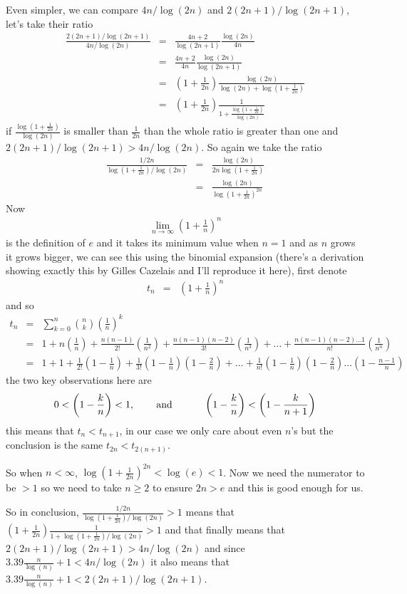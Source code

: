 \documentclass[aps,preprint,preprintnumbers,nofootinbib,showpacs,prd]{revtex4-1}
\newcommand{\nbea}{\begin{eqnarray*}}
\newcommand{\neea}{\end{eqnarray*}}
\begin{document}
Even simpler, we can compare $4n/\log(2n)$ and $2(2n+1)/\log(2n+1)$, let's take their ratio
%
\nbea
\frac{2(2n+1)/\log(2n+1)}{4n/\log(2n)} & = & \frac{4n+2}{\log(2n+1)}\frac{\log(2n)}{4n}\\
& = & \frac{4n+2}{4n} \frac{\log(2n)}{\log(2n+1)} \\
& = & \left(1 + \frac{1}{2n}\right)\frac{\log(2n)}{\log(2n) + \log\left(1 + \frac{1}{2n}\right)} \\
& = & \left(1 + \frac{1}{2n}\right) \frac{1}{1 + \frac{\log\left(1 + \frac{1}{2n}\right)}{\log(2n)}}
\neea
%
if $\frac{\log\left(1 + \frac{1}{2n}\right)}{\log(2n)}$ is smaller than $\frac{1}{2n}$ than the whole ratio is greater than one and $2(2n+1)/\log(2n+1) > 4n/\log(2n)$. So again we take the ratio
%
\nbea
\frac{1/2n}{\log\left(1 + \frac{1}{2n}\right)/\log(2n)} & = & \frac{\log(2n)}{2n\log\left(1 + \frac{1}{2n}\right)} \\
& = & \frac{\log(2n)}{\log\left(1 + \frac{1}{2n}\right)^{2n}}
\neea
%
Now
%
\nbea
\lim_{n\to\infty} \left(1 + \frac{1}{n}\right)^{n}
\neea
%
is the definition of $e$ and it takes its minimum value when $n=1$ and as $n$ grows it grows bigger, we can see this using the binomial expansion (there's a derivation showing exactly this by Gilles Cazelais and I'll reproduce it here), first denote
%
\nbea
t_n & = & \left(1+\frac{1}{n}\right)^n
\neea
%
and so
%
\nbea
t_n  & = & \sum_{k=0}^n {n \choose k}\left(\frac{1}{n}\right)^k \\
& = & 1 + n\left(\frac{1}{n}\right) + \frac{n(n-1)}{2!}\left(\frac{1}{n^2}\right)+ \frac{n(n-1)(n-2)}{3!}\left(\frac{1}{n^3}\right) + \ldots + \frac{n(n-1)(n-2)\ldots 1}{n!}\left(\frac{1}{n^n}\right) \\
& = & 1 + 1 + \frac{1}{2!}\left(1-\frac{1}{n}\right) + \frac{1}{3!}\left(1-\frac{1}{n}\right)\left(1-\frac{2}{n}\right) + \ldots + \frac{1}{n!}\left(1-\frac{1}{n}\right)\left(1-\frac{2}{n}\right)\ldots \left(1-\frac{n-1}{n}\right)
\neea
%
the two key observations here are
%
\nbea
0 < \left(1-\frac{k}{n}\right) <1, & {\rm ~~~~~~~and~~~~~~~} & \left(1-\frac{k}{n}\right) < \left(1-\frac{k}{n+1}\right)
\neea
%
this means that $t_n < t_{n+1}$, in our case we only care about even $n$'s but the conclusion is the same $t_{2n}<t_{2(n+1)}$.

So when $n < \infty$, $\log\left(1 + \frac{1}{2n}\right)^{2n} < \log(e) < 1$. Now we need the numerator to be $>1$ so we need to take $n\ge2$ to ensure $2n > e$ and this is good enough for us.

So in conclusion, $\frac{1/2n}{\log\left(1 + \frac{1}{2n}\right)/\log(2n)} > 1$ means that $\left(1 + \frac{1}{2n}\right) \frac{1}{1 + \log\left(1 + \frac{1}{2n}\right)/\log(2n)} > 1$ and that finally means that $2(2n+1)/\log(2n+1) > 4n/\log(2n)$ and since $3.39 \frac{n}{\log(n)}+1 < 4n/\log(2n)$ it also means that $3.39 \frac{n}{\log(n)}+1 < 2(2n+1)/\log(2n+1)$.
\end{document}
